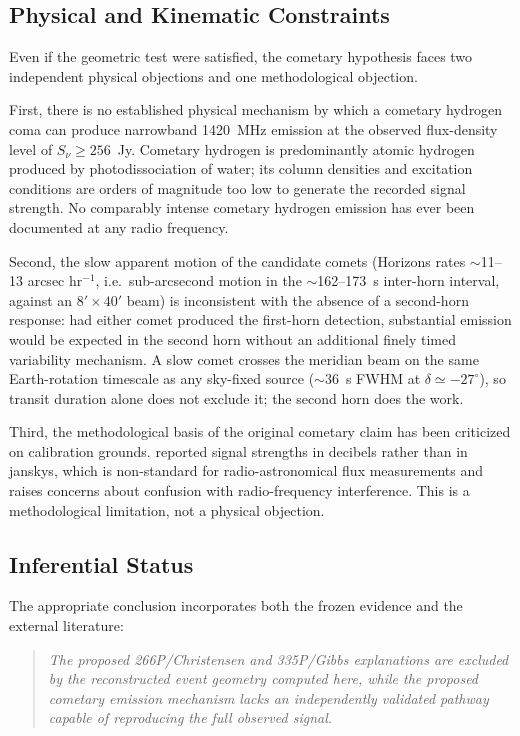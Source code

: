 \documentclass[twocolumn]{aastex701}
\newcommand{\snu}{S_\nu}
\begin{document}
\subsection{Physical and Kinematic Constraints}

Even if the geometric test were satisfied, the cometary hypothesis faces two independent physical objections and one methodological objection.

First, there is no established physical mechanism by which a cometary hydrogen coma can produce narrowband 1420~MHz emission at the observed flux-density level of $\snu\geq256$~Jy. Cometary hydrogen is predominantly atomic hydrogen produced by photodissociation of water; its column densities and excitation conditions are orders of magnitude too low to generate the recorded signal strength. No comparably intense cometary hydrogen emission has ever been documented at any radio frequency.

Second, the slow apparent motion of the candidate comets (Horizons rates $\sim$11--13 arcsec hr$^{-1}$, i.e.\ sub-arcsecond motion in the $\sim$162--173~s inter-horn interval, against an $8'\times40'$ beam) is inconsistent with the absence of a second-horn response: had either comet produced the first-horn detection, substantial emission would be expected in the second horn without an additional finely timed variability mechanism. A slow comet crosses the meridian beam on the same Earth-rotation timescale as any sky-fixed source ($\sim$36~s FWHM at $\delta\simeq-27^\circ$), so transit duration alone does not exclude it; the second horn does the work.

Third, the methodological basis of the original cometary claim has been criticized on calibration grounds. \citet{paris2017} reported signal strengths in decibels rather than in janskys, which is non-standard for radio-astronomical flux measurements and raises concerns about confusion with radio-frequency interference. This is a methodological limitation, not a physical objection.

\subsection{Inferential Status}

The appropriate conclusion incorporates both the frozen evidence and the external literature:
\begin{quote}
\emph{The proposed 266P/Christensen and 335P/Gibbs explanations are excluded by the reconstructed event geometry computed here, while the proposed cometary  emission mechanism lacks an independently validated pathway capable of reproducing the full observed signal.}
\end{quote}
\end{document}
